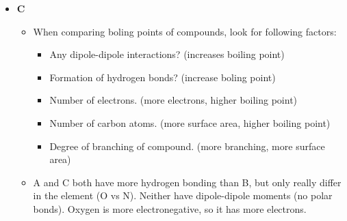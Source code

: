 \documentclass[12pt,a4paper]{article}
\begin{document}
\begin{enumerate}
{    \hspace{15pt}
    \hspace{15pt}
    \hspace{15pt}
    }
    \begin{itemize}
        \item {\color{o-Sun}\textbf{C}}
            \begin{itemize}
                \item When comparing boling points of compounds, look for following factors:
                    \begin{itemize}
                        \item Any dipole-dipole interactions? (increases boiling point)
                        \item Formation of hydrogen bonds? (increase boling point)
                        \item Number of electrons. (more electrons, higher boiling point)
                        \item Number of carbon atoms. (more surface area, higher boiling point)
                        \item Degree of branching of compound. (more branching, more surface area)
                    \end{itemize}
                \item A and C both have more hydrogen bonding than B, but only really differ in the element (O vs N). Neither have dipole-dipole moments (no polar bonds). Oxygen is more electronegative, so it has more electrons.  
            \end{itemize}
    \end{itemize}
\end{enumerate}

\newpage
{}
\end{document}
